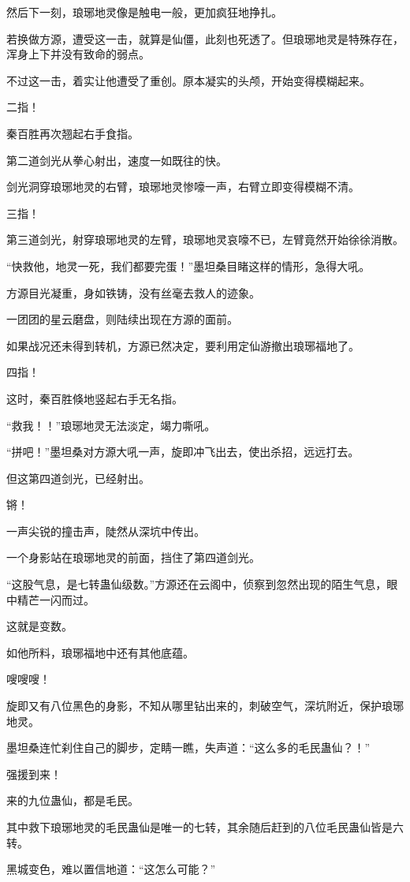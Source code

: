 \begin{this_body}
然后下一刻，琅琊地灵像是触电一般，更加疯狂地挣扎。

若换做方源，遭受这一击，就算是仙僵，此刻也死透了。但琅琊地灵是特殊存在，浑身上下并没有致命的弱点。

不过这一击，着实让他遭受了重创。原本凝实的头颅，开始变得模糊起来。

二指！

秦百胜再次翘起右手食指。

第二道剑光从拳心射出，速度一如既往的快。

剑光洞穿琅琊地灵的右臂，琅琊地灵惨嚎一声，右臂立即变得模糊不清。

三指！

第三道剑光，射穿琅琊地灵的左臂，琅琊地灵哀嚎不已，左臂竟然开始徐徐消散。

“快救他，地灵一死，我们都要完蛋！”墨坦桑目睹这样的情形，急得大吼。

方源目光凝重，身如铁铸，没有丝毫去救人的迹象。

一团团的星云磨盘，则陆续出现在方源的面前。

如果战况还未得到转机，方源已然决定，要利用定仙游撤出琅琊福地了。

四指！

这时，秦百胜倏地竖起右手无名指。

“救我！！”琅琊地灵无法淡定，竭力嘶吼。

“拼吧！”墨坦桑对方源大吼一声，旋即冲飞出去，使出杀招，远远打去。

但这第四道剑光，已经射出。

锵！

一声尖锐的撞击声，陡然从深坑中传出。

一个身影站在琅琊地灵的前面，挡住了第四道剑光。

“这股气息，是七转蛊仙级数。”方源还在云阁中，侦察到忽然出现的陌生气息，眼中精芒一闪而过。

这就是变数。

如他所料，琅琊福地中还有其他底蕴。

嗖嗖嗖！

旋即又有八位黑色的身影，不知从哪里钻出来的，刺破空气，深坑附近，保护琅琊地灵。

墨坦桑连忙刹住自己的脚步，定睛一瞧，失声道：“这么多的毛民蛊仙？！”

强援到来！

来的九位蛊仙，都是毛民。

其中救下琅琊地灵的毛民蛊仙是唯一的七转，其余随后赶到的八位毛民蛊仙皆是六转。

黑城变色，难以置信地道：“这怎么可能？”


\end{this_body}
